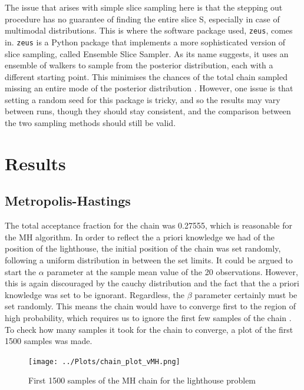 \documentclass[12pt]{report} %
\begin{document}
\vspace*{1\baselineskip}
The issue that arises with simple slice sampling here is that the stepping out procedure has no guarantee of finding the entire slice S, especially in case of multimodal distributions. This is where the software package used, \texttt{zeus}, comes in. \texttt{zeus} is a Python package that implements a more sophisticated version of slice sampling, called Ensemble Slice Sampler. As its name suggests, it uses an ensemble of walkers to sample from the posterior distribution, each with a different starting point. This minimises the chances of the total chain sampled missing an entire mode of the posterior distribution \cite{karamanis_zeus}. However, one issue is that setting a random seed for this package is tricky, and so the results may vary between runs, though they should stay consistent, and the comparison between the two sampling methods should still be valid.


\section{Results}

\subsection{Metropolis-Hastings}


The total acceptance fraction for the chain was 0.27555, which is reasonable for the MH algorithm\cite{metropolis_hastings}\cite{bedard_optimal_acceptance_rates}. In order to reflect the a priori knowledge we had of the position of the lighthouse, the initial position of the chain was set randomly, following a uniform distribution in between the set limits. It could be argued to start the $\alpha$ parameter at the sample mean value of the 20 observations. However, this is again discouraged by the cauchy distribution and the fact that the a priori knowledge was set to be ignorant. Regardless, the $\beta$ parameter certainly must be set randomly. This means the chain would have to converge first to the region of high probability, which requires us to ignore the first few samples of the chain \cite{ravenzwaaij_markov_chain}. To check how many samples it took for the chain to converge, a plot of the first 1500 samples was made.

\begin{figure}[h]
\centering
\texttt{[image: ../Plots/chain\_plot\_vMH.png]}
\caption{First 1500 samples of the MH chain for the lighthouse problem}
\label{fig:MH_convergence}
\end{figure}
\end{document}
